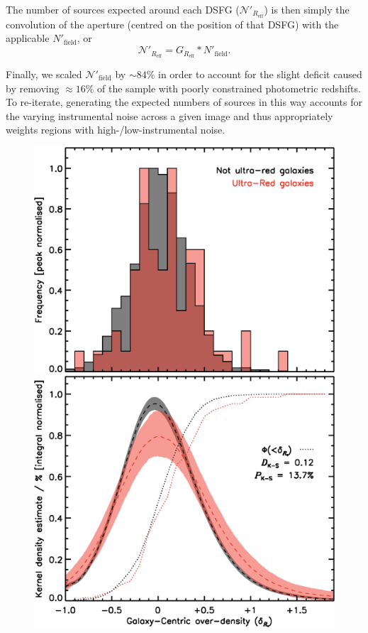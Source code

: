 \documentclass[a4paper, fleqn, usenatbib]{mnras}
\newcommand{\reff}{R_{\text{eff}}}
\begin{document}
The number of sources expected around each DSFG ($\mathcal{N}'_{\reff{}}$) is then simply the convolution of the aperture (centred on the position of that DSFG) with the applicable $N'_{\text{field}}$, or $$\mathcal{N}'_{\reff{}}=G_{\reff{}}*N'_{\text{field}}.$$

Finally, we scaled $\mathcal{N}'_{\text{field}}$ by $\sim84\%$ in order to account for the slight deficit caused by removing $\approx16\%$ of the sample with poorly constrained photometric redshifts.
To re-iterate, generating the expected numbers of sources in this way accounts for the varying instrumental noise across a given image and thus appropriately weights regions with high-/low-instrumental noise.

\begin{figure}
    \centering
    \includegraphics[width=\columnwidth]{overdensity_histogram}\\ %
    \includegraphics[width=\columnwidth]{overdensity_kernel_density_estimate}

\end{figure}
\end{document}
